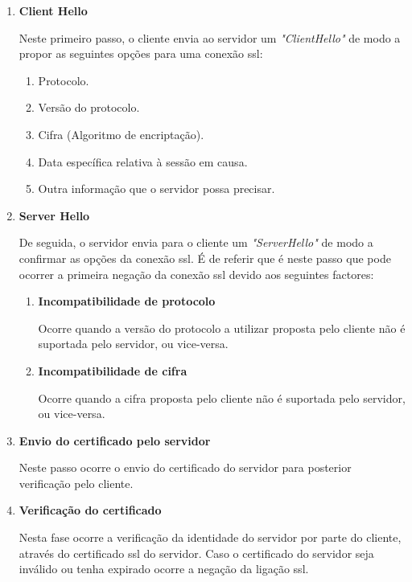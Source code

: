 \begin{enumerate}
    \item \textbf{Client Hello}
    
    Neste primeiro passo, o cliente envia ao servidor um \emph{"ClientHello"} de modo a propor as seguintes opções para uma conexão \gls{ssl}:
    
    \begin{enumerate}
        \item Protocolo.
        \item Versão do protocolo.
        \item Cifra (Algoritmo de encriptação).
        \item Data específica relativa à sessão em causa.
        \item Outra informação que o servidor possa precisar.
    \end{enumerate}
    
    \item \textbf{Server Hello}
    
    De seguida, o servidor envia para o cliente um \textit{"ServerHello"} de modo a confirmar as opções da conexão \gls{ssl}. É de referir que é neste passo que pode ocorrer a primeira negação da conexão \gls{ssl} devido aos seguintes factores:
    
    \begin{enumerate}
        \item \textbf{Incompatibilidade de protocolo}
        
        Ocorre quando a versão do protocolo a utilizar proposta pelo cliente não é suportada pelo servidor, ou vice-versa.
        
        \item \textbf{Incompatibilidade de cifra}
        
        Ocorre quando a cifra proposta pelo cliente não é suportada pelo servidor, ou vice-versa.
    \end{enumerate}
    
    \item \textbf{Envio do certificado pelo servidor}
    
    Neste passo ocorre o envio do certificado do servidor para posterior verificação pelo cliente.
    
    \item \textbf{Verificação do certificado}
    
    Nesta fase ocorre a verificação da identidade do servidor por parte do cliente, através do certificado \gls{ssl} do servidor. Caso o certificado do servidor seja inválido ou tenha expirado ocorre a negação da ligação \gls{ssl}.
    

\end{enumerate}
